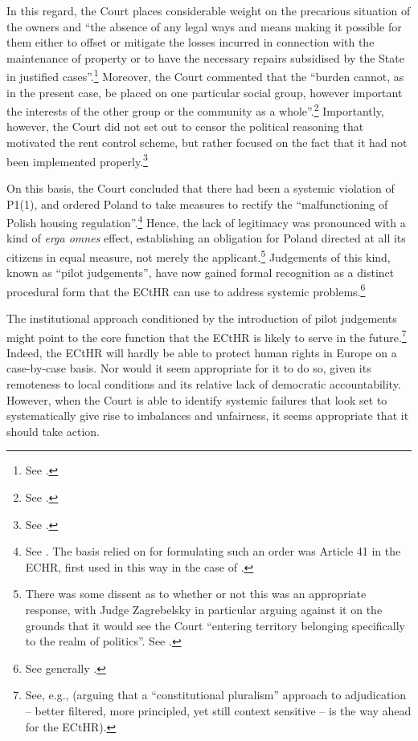 In this regard, the Court places considerable weight on the precarious situation of the owners and ``the absence of any legal ways and means making it possible for them either to offset or mitigate the losses incurred in connection with the maintenance of property or to have the necessary repairs subsidised by the State in justified cases''.\footnote{See \cite[224]{hutten06}.} Moreover, the Court commented that the ``burden cannot, as in the present case, be placed on one particular social group, however important the interests of the other group or the community as a whole''.\footnote{See \cite[225]{hutten06}.} Importantly, however, the Court did not set out to censor the political reasoning that motivated the rent control scheme, but rather focused on the fact that it had not been implemented properly.\footnote{See \cite[224]{hutten06}.}

On this basis, the Court concluded that there had been a systemic violation of P1(1), and ordered Poland to take measures to rectify the ``malfunctioning of Polish housing regulation''.\footnote{See \cite[237]{hutten06}. The basis relied on for formulating such an order was Article 41 in the ECHR, first used in this way in the case of \cite{broniowski05}.} Hence, the lack of legitimacy was pronounced with a kind of {\it erga omnes} effect, establishing an obligation for Poland directed at all its citizens in equal measure, not merely the applicant.\footnote{There was some dissent as to whether or not this was an appropriate response, with Judge Zagrebelsky in particular arguing against it on the grounds that it would see the Court ``entering territory belonging specifically to the realm of politics''. See \cite{hutten06}.} Judgements of this kind, known as ``pilot judgements'', have now gained formal recognition as a distinct procedural form that the ECtHR can use to address systemic problems.\footnote{See generally \cite{leach10}.}

The institutional approach conditioned by the introduction of pilot judgements might point to the core function that the ECtHR is likely to serve in the future.\footnote{See, e.g., \cite{greer12} (arguing that a ``constitutional pluralism'' approach to adjudication -- better filtered, more principled, yet still context sensitive --  is the way ahead for the ECtHR).} Indeed, the ECtHR will hardly be able to protect human rights in Europe on a case-by-case basis. Nor would it seem appropriate for it to do so, given its remoteness to local conditions and its relative lack of democratic accountability. However, when the Court is able to identify systemic failures that look set to systematically give rise to imbalances and unfairness, it seems appropriate that it should take action.

